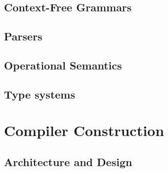 \subsection{Context-Free Grammars}

\subsection{Parsers}

\subsection{Operational Semantics}

\subsection{Type systems}

\section{Compiler Construction}

\subsection{Architecture and Design}
